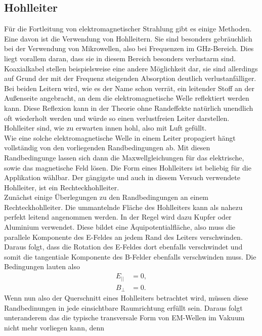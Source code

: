 \subsection{Hohlleiter}
Für die Fortleitung von elektromagnetischer Strahlung gibt es einige Methoden. Eine davon ist die Verwendung von Hohlleitern. Sie sind besonders gebräuchlich bei der Verwendung von Mikrowellen, also bei Frequenzen im $\si{\giga\hertz}$-Bereich.
Dies liegt vorallem daran, dass sie in diesem Bereich besonders verlustarm sind. Koaxialkabel stellen beispielsweise eine andere Möglichkeit dar, sie sind allerdings auf Grund der mit der Frequenz steigenden Absorption deutlich 
verlustanfälliger. Bei beiden Leitern wird, wie es der Name schon verrät, ein leitender Stoff an der Außenseite angebracht, an dem die elektromagnetische Welle reflektiert werden kann. Diese Reflexion kann in der Theorie ohne Randeffekte natürlich unendlich oft
wiederholt werden und würde so einen verlustfreien Leiter darstellen. Hohlleiter sind, wie zu erwarten innen hohl, also mit Luft gefüllt.
\\
\newline
Wie eine solche elektromagnetische Welle in einem Leiter propagiert hängt vollständig von den vorliegenden Randbedingungen ab. Mit diesen Randbedingunge lassen sich dann die Maxwellgleichungen für das elektrische, sowie das magnetische Feld lösen.
Die Form eines Hohlleiters ist beliebig für die Applikation wählbar. Der gängigste und auch in diesem Versuch verwendete Hohlleiter, ist ein Rechteckhohlleiter. 
\\
\newline
Zunächst einige Überlegungen zu den Randbedingungen an einem Rechteckhohlleiter. Die ummantelnde Fläche des Hohlleiters kann als nahezu perfekt leitend angenommen werden. In der Regel wird dazu Kupfer oder Aluminium verwendet. Diese bildet eine 
Äquipotentialfläche, also muss die parallele Komponente des E-Feldes an jedem Rand des Leiters verschwinden. Daraus folgt, dass die Rotation des E-Feldes dort ebenfalls verschwindet und somit die tangentiale Komponente des B-Felder ebenfalls
verschwinden muss. Die Bedingungen lauten also
\begin{align*}
E_{||} &= 0, \\
B_{⊥} &= 0.
\end{align*}
Wenn nun also der Querschnitt eines Hohlleiters betrachtet wird, müssen diese Randbedinungen in jede einsichtbare Raumrichtung erfüllt sein. Daraus folgt unteranderem das die typische transversale Form von EM-Wellen im Vakuum nicht mehr vorliegen kann, denn
